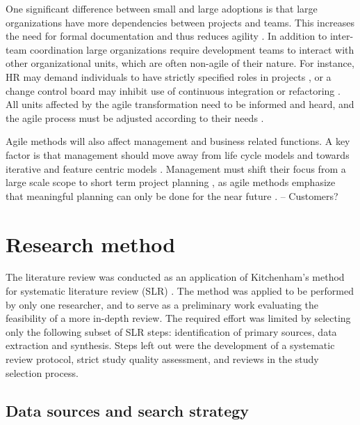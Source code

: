 \documentclass[lnbip]{svmultln}
\begin{document}
One significant difference between small and large adoptions is that large
organizations have more dependencies between projects and teams. This increases
the need for formal documentation and thus reduces agility \cite{Lindvall2004}.
In addition to inter-team coordination large organizations require development
teams to interact with other organizational units, which are often non-agile of
their nature. For instance, HR may demand individuals to have strictly specified
roles in projects \cite{Boehm2005}, or a change control board may inhibit use of
continuous integration or refactoring \cite{Lindvall2004}. All units affected by
the agile transformation need to be informed and heard, and the agile process
must be adjusted according to their needs \cite{Lindvall2004, Cohn2003,
Boehm2005}.

Agile methods will also affect management and business related functions. A key
factor is that management should move away from life cycle models and towards
iterative and feature centric models \cite{Nerur2005}. Management must shift
their focus from a large scale scope to short term project planning
\cite{Misra2010}, as agile methods emphasize that meaningful planning can only
be done for the near future \cite{Boehm2005}.
-- Customers?



\section{Research method}
\label{sec:method}

%
%
%


The literature review was conducted as an application of Kitchenham's
method for systematic literature review (SLR) \cite{Kitchenham2007}. The method
was applied to be performed by only one researcher, and to serve as a
preliminary work evaluating the feasibility of a more in-depth review. The
required effort was limited by selecting only the following subset of SLR steps:
identification of primary sources, data extraction and synthesis. Steps left out
were the development of a systematic review protocol, strict study quality
assessment, and reviews in the study selection process.

\subsection{Data sources and search strategy}
\end{document}
